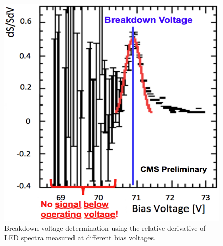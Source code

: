 \begin{figure}[h]
\centering
\begin{minipage}[t]{0.475\textwidth}
\includegraphics[width=\textwidth]{Bilder/bvLedScaled.png}
\caption{Breakdown voltage determination using the relative derivative of LED spectra measured at different bias voltages.}
\label{bvLed}
\end{minipage}
\hspace{0.5cm}
\begin{minipage}[t]{0.475\textwidth}

\end{minipage}
\end{figure}